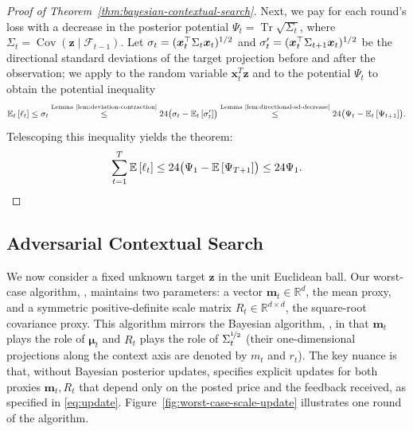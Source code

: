 \documentclass[11pt]{article}
\newcommand{\E}[1]{\mathbb E\left[#1\right]}
\newcommand{\Esub}[2]{\mathbb E_{#1}\left[#2\right]}
\newcommand{\R}{\mathbb R}
\DeclareMathOperator{\Cov}{Cov}
\DeclareMathOperator{\Tr}{Tr}
\newcommand{\bmu}{\boldsymbol\mu}
\newcommand{\bm}{\boldsymbol m}
\newcommand{\bx}{\boldsymbol x}
\newcommand{\bz}{\boldsymbol z}
\begin{document}
\begin{proof}[Proof of Theorem~\ref{thm:bayesian-contextual-search}]
Next, we pay for each round's loss with a decrease in the posterior potential
 $\Psi_t=\Tr\sqrt{\Sigma_t}$, where $\Sigma_t=\Cov(\bz\mid\mathcal F_{t-1})$.
Let
$\sigma_t=\agsqrt{\bx_t^\top\Sigma_t\bx_t}$ and
$\sigma_t'=\agsqrt{\bx_t^\top\Sigma_{t+1}\bx_t}$ be the directional standard deviations
of the target projection before and after the observation; we apply  to the random variable $\bx_t^T\bz$ and   to the potential $\Psi_t$ to obtain {the potential inequality}
\[
 \Esub{t}{\ell_t}\le\sigma_t
 \overset{\text{Lemma~\ref{lem:deviation-contraction}}}{\le}
 24\bigl(\sigma_t-\Esub{t}{\sigma_t'}
 \bigr)
 \overset{\text{Lemma~\ref{lem:directional-sd-decrease}}}{\le}
 24\bigl(\Psi_t-\Esub{t}{\Psi_{t+1}}\bigr).
\]
{Telescoping this inequality yields the theorem:}
\[
 \sum_{t=1}^T\E{\ell_t}
 \le
 24\bigl(\Psi_1-\E{\Psi_{T+1}}\bigr)
 \le24\Psi_1.\qedhere
\]
\end{proof}


\subsection{Adversarial Contextual Search}\label{sec:adversarial}\label{sec:algorithm}

We now consider a fixed unknown target $\bz$ in the unit Euclidean ball. Our worst-case algorithm, , maintains two parameters: a vector $\bm_t\in\R^d$, the mean proxy, and a symmetric positive-definite scale matrix $R_t\in\R^{d\times d}$, the square-root covariance proxy.
This algorithm mirrors the Bayesian algorithm, , in that $\bm_t$ plays the role of $\bmu_t$ and $R_t$ plays the role of $\Sigma_t^{\nicefrac 12}$ (their one-dimensional projections along the context axis are denoted by $m_t$ and $r_t$). The key nuance is that, without Bayesian posterior updates,  specifies explicit updates for both proxies $\bm_t,R_t$ that depend only on the posted price and {the feedback received, as specified in} \eqref{eq:update}. Figure~\ref{fig:worst-case-scale-update} illustrates one round of the algorithm.
\end{document}
